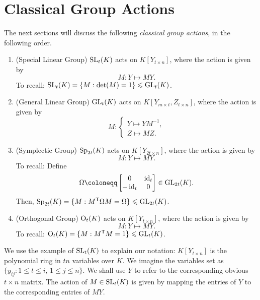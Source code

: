 \documentclass[12pt]{article}
\begin{document}
\section{Classical Group Actions}

The next sections will discuss the following \emph{classical group actions}, in the following order.

\begin{enumerate}[label=(\Roman*)]
	\item (Special Linear Group) $\operatorname{SL}_{t}(K)$ acts on $K[Y_{t \times n}]$, where the action is given by
	\begin{equation*} 
		M : Y \mapsto MY.
	\end{equation*}
	To recall: $\operatorname{SL}_{t}(K) = \{M : \det(M) = 1\} \leqslant \operatorname{GL}_{t}(K)$.
	\item (General Linear Group) $\operatorname{GL}_{t}(K)$ acts on $K[Y_{m \times t}, Z_{t \times n}]$, where the action is given by
	\begin{equation*} 
		M : 
		\begin{cases}
			Y \mapsto YM^{-1}, \\
			Z \mapsto MZ.
		\end{cases}
	\end{equation*}
	\item (Symplectic Group) $\operatorname{Sp}_{2t}(K)$ acts on $K[Y_{2t \times n}]$, where the action is given by
	\begin{equation*} 
		M : Y \mapsto MY.
	\end{equation*}
	To recall: Define
	\begin{equation*} 
		\Omega \coloneqq 
		\two{0}{\id_{t}}{-\id_{t}}{0} \in \GL_{2t}(K).
	\end{equation*}
	Then, $\operatorname{Sp}_{2t}(K) = \{M : M^{\mathsf{T}} \Omega M = \Omega\} \leqslant \operatorname{GL}_{2t}(K)$.
	\item (Orthogonal Group) $\operatorname{O}_{t}(K)$ acts on $K[Y_{t \times n}]$, where the action is given by
	\begin{equation*} 
		M : Y \mapsto MY.
	\end{equation*}
	To recall: $\operatorname{O}_{t}(K) = \{M : M^{\mathsf{T}} M = 1\} \leqslant \operatorname{GL}_{t}(K)$.
\end{enumerate}

We use the example of $\operatorname{SL}_{t}(K)$ to explain our notation: $K[Y_{t \times n}]$ is the polynomial ring in $tn$ variables over $K$. We imagine the variables set as $\{y_{ij} : 1 \le t \le i,\, 1 \le j \le n\}$. We shall use $Y$ to refer to the corresponding obvious $t \times n$ matrix. The action of $M \in \operatorname{SL}_{t}(K)$ is given by mapping the entries of $Y$ to the corresponding entries of $MY$.
\end{document}
